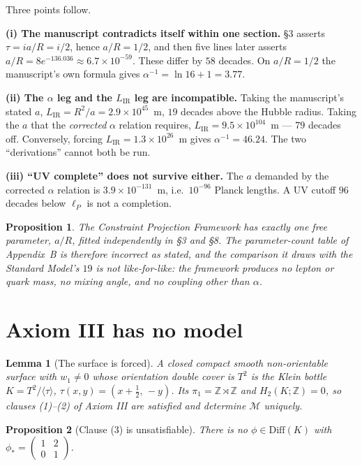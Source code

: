 \documentclass[11pt,a4paper]{article}
\newtheorem{proposition}{Proposition}
\newtheorem{lemma}{Lemma}
\begin{document}
Three points follow.

\textbf{(i) The manuscript contradicts itself within one section.} \S3 asserts
$\tau = ia/R = i/2$, hence $a/R = 1/2$, and then five lines later asserts
$a/R = 8e^{-136.036} \approx 6.7\times10^{-59}$. These differ by $58$ decades. On
$a/R = 1/2$ the manuscript's own formula gives $\alpha^{-1} = \ln 16 + 1 = 3.77$.

\textbf{(ii) The $\alpha$ leg and the $L_{\mathrm{IR}}$ leg are incompatible.}
Taking the manuscript's stated $a$, $L_{\mathrm{IR}} = R^2/a = 2.9\times10^{45}$~m,
$19$ decades above the Hubble radius. Taking the $a$ that the \emph{corrected}
$\alpha$ relation requires, $L_{\mathrm{IR}} = 9.5\times10^{104}$~m --- $79$ decades
off. Conversely, forcing $L_{\mathrm{IR}} = 1.3\times10^{26}$~m gives
$\alpha^{-1} = 46.24$. The two ``derivations'' cannot both be run.

\textbf{(iii) ``UV complete'' does not survive either.} The $a$ demanded by the
corrected $\alpha$ relation is $3.9\times10^{-131}$~m, i.e.\ $10^{-96}$ Planck
lengths. A UV cutoff $96$ decades below $\ell_P$ is not a completion.

\begin{proposition}
The Constraint Projection Framework has exactly one free parameter, $a/R$, fitted
independently in \S3 and \S8. The parameter-count table of Appendix~B is therefore
incorrect as stated, and the comparison it draws with the Standard Model's $19$ is
not like-for-like: the framework produces no lepton or quark mass, no mixing angle,
and no coupling other than $\alpha$.
\end{proposition}

\section{Axiom III has no model}
\label{sec:axiom3}

\begin{lemma}[The surface is forced]
A closed compact smooth non-orientable surface with $w_1\neq0$ whose orientation
double cover is $T^2$ is the Klein bottle $K = T^2/\langle\tau\rangle$,
$\tau(x,y) = (x+\tfrac12,\,-y)$. Its $\pi_1 = \mathbb{Z}\rtimes\mathbb{Z}$ and
$H_2(K;\mathbb{Z}) = 0$, so clauses (1)--(2) of Axiom III are satisfied and
determine $\mathcal{M}$ uniquely.
\end{lemma}

\begin{proposition}[Clause (3) is unsatisfiable]
\label{prop:axiom3}
There is no $\phi\in\mathrm{Diff}(K)$ with
$\phi_* = \left(\begin{smallmatrix}1&2\\0&1\end{smallmatrix}\right)$.
\end{proposition}
\end{document}
